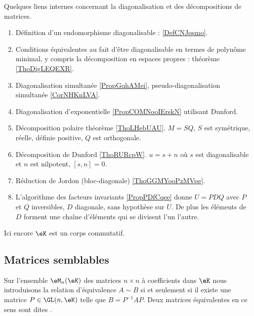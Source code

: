 Quelques liens internes concernant la diagonalisation et des décompositions de matrices.
\begin{enumerate}
    \item
        Définition d'un endomorphisme diagonalisable : \ref{DefCNJqsmo}.
    \item
        Conditions équivalentes au fait d'être diagonalisable en termes de polynôme minimal, y compris la décomposition en espaces propres : théorème \ref{ThoDigLEQEXR}.
    \item
        Diagonalisation simultanée \ref{PropGqhAMei}, pseudo-diagonalisation simultanée \ref{CorNHKnLVA}.
    \item
        Diagonalisation d'exponentielle \ref{PropCOMNooIErskN} utilisant Dunford.
    \item
        Décomposition polaire théorème \ref{ThoLHebUAU}. \( M=SQ\), \( S\) est symétrique, réelle, définie positive, \( Q\) est orthogonale.
    \item
        Décomposition de Dunford \ref{ThoRURcpW}. \( u=s+n\) où \( s\) est diagonalisable et \( n\) est nilpotent, \( [s,n]=0\).
    \item 
        Réduction de Jordon (bloc-diagonale) \ref{ThoGGMYooPzMVpe}.
    \item 
        L'algorithme des facteurs invariants \ref{PropPDfCqee} donne \( U=PDQ\) avec \( P\) et \( Q\) inversibles, \( D\) diagonale, sans hypothèse sur \( U\). De plus les éléments de \( D\) forment une chaîne d'éléments qui se divisent l'un l'autre.
\end{enumerate}

Ici encore \( \eK\) est un corps commutatif.

\subsection{Matrices semblables}

\begin{definition} \label{DefCQNFooSDhDpB}
    Sur l'ensemble \( \eM_n(\eK)\) des matrices \( n\times n\) à coefficients dans \(\eK\) nous introduisons la relation d'équivalence \( A\sim B\) si et seulement si il existe une matrice \( P\in\GL(n,\eK)\) telle que \( B=P^{-1}AP\). Deux matrices équivalentes en ce sens sont dites .
\end{definition}

